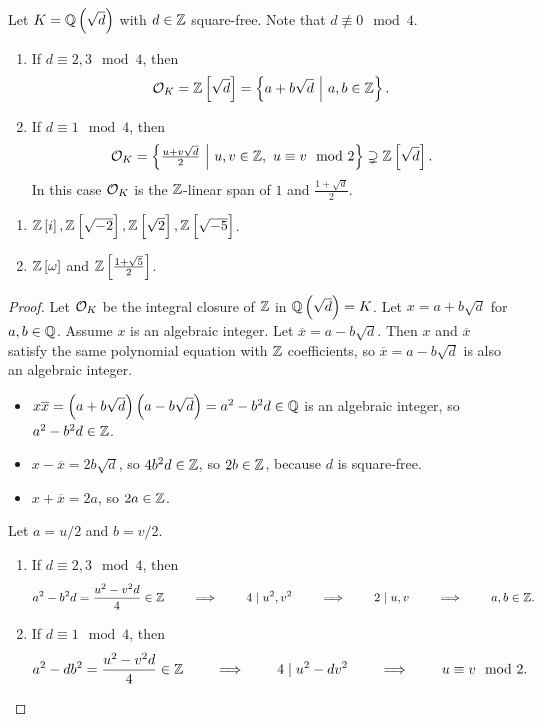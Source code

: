 \pagebreak

\begin{theorem}
Let $ K = \QQ\br{\sqrt{d}} $ with $ d \in \mathbb{Z} $ square-free. Note that $ d \not\equiv 0 \mod 4 $.
\begin{enumerate}
\item If $ d \equiv 2, 3 \mod 4 $, then
$$ \OOO_K = \ZZ\sbr{\sqrt{d}} = \cbr{a + b\sqrt{d} \st a, b \in \ZZ}. $$
\item If $ d \equiv 1 \mod 4 $, then
$$ \OOO_K = \cbr{\tfrac{u + v\sqrt{d}}{2} \st u, v \in \ZZ, \ u \equiv v \mod 2} \supsetneq \ZZ\sbr{\sqrt{d}}. $$
In this case $ \mathcal{O}_K $ is the $ \mathbb{Z} $-linear span of $ 1 $ and $ \tfrac{1 + \sqrt{d}}{2} $.
\end{enumerate}
\end{theorem}

\begin{example*}
\hfill
\begin{enumerate}
\item $ \ZZ\sbr{i}, \ZZ\sbr{\sqrt{-2}}, \ZZ\sbr{\sqrt{2}}, \ZZ\sbr{\sqrt{-5}} $.
\item $ \ZZ\sbr{\omega} $ and $ \ZZ\sbr{\tfrac{1 + \sqrt{5}}{2}} $.
\end{enumerate}
\end{example*}

\begin{proof}
Let $ \mathcal{O}_K $ be the integral closure of $ \mathbb{Z} $ in $ \QQ\br{\sqrt{d}} = K $. Let $ x = a + b\sqrt{d} $ for $ a, b \in \mathbb{Q} $. Assume $ x $ is an algebraic integer. Let $ \overline{x} = a - b\sqrt{d} $. Then $ x $ and $ \overline{x} $ satisfy the same polynomial equation with $ \mathbb{Z} $ coefficients, so $ \overline{x} = a - b\sqrt{d} $ is also an algebraic integer.
\begin{itemize}
\item $ x\overline{x} = \br{a + b\sqrt{d}}\br{a - b\sqrt{d}} = a^2 - b^2d \in \QQ $ is an algebraic integer, so $ a^2 - b^2d \in \mathbb{Z} $.
\item $ x - \overline{x} = 2b\sqrt{d} $, so $ 4b^2d \in \mathbb{Z} $, so $ 2b \in \mathbb{Z} $, because $ d $ is square-free.
\item $ x + \overline{x} = 2a $, so $ 2a \in \mathbb{Z} $.
\end{itemize}
Let $ a = u / 2 $ and $ b = v / 2 $.
\begin{enumerate}
\item If $ d \equiv 2, 3 \mod 4 $, then
$$ a^2 - b^2d = \dfrac{u^2 - v^2d}{4} \in \mathbb{Z} \qquad \implies \qquad 4 \mid u^2, v^2 \qquad \implies \qquad 2 \mid u, v \qquad \implies \qquad a, b \in \mathbb{Z}. $$
\item If $ d \equiv 1 \mod 4 $, then
$$ a^2 - db^2 = \dfrac{u^2 - v^2d}{4} \in \mathbb{Z} \qquad \implies \qquad 4 \mid u^2 - dv^2 \qquad \implies \qquad u \equiv v \mod 2. $$
\end{enumerate}
\end{proof}

